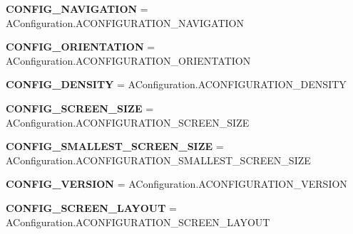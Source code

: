 \begin{DoxyCompactItemize}
{\bfseries C\+O\+N\+F\+I\+G\+\_\+\+N\+A\+V\+I\+G\+A\+T\+I\+ON} = A\+Configuration.\+A\+C\+O\+N\+F\+I\+G\+U\+R\+A\+T\+I\+O\+N\+\_\+\+N\+A\+V\+I\+G\+A\+T\+I\+ON
\item 
\mbox{\label{classconfig_1_1ResTable__config_1_1Config_a75e3389c436ef25b6b6ab44ea451975d}} 
{\bfseries C\+O\+N\+F\+I\+G\+\_\+\+O\+R\+I\+E\+N\+T\+A\+T\+I\+ON} = A\+Configuration.\+A\+C\+O\+N\+F\+I\+G\+U\+R\+A\+T\+I\+O\+N\+\_\+\+O\+R\+I\+E\+N\+T\+A\+T\+I\+ON
\item 
\mbox{\label{classconfig_1_1ResTable__config_1_1Config_a87ebb7ea8eb31b5265d965bba21670ec}} 
{\bfseries C\+O\+N\+F\+I\+G\+\_\+\+D\+E\+N\+S\+I\+TY} = A\+Configuration.\+A\+C\+O\+N\+F\+I\+G\+U\+R\+A\+T\+I\+O\+N\+\_\+\+D\+E\+N\+S\+I\+TY
\item 
\mbox{\label{classconfig_1_1ResTable__config_1_1Config_a337d3ff55747ffadae53a0694fb8a4b1}} 
{\bfseries C\+O\+N\+F\+I\+G\+\_\+\+S\+C\+R\+E\+E\+N\+\_\+\+S\+I\+ZE} = A\+Configuration.\+A\+C\+O\+N\+F\+I\+G\+U\+R\+A\+T\+I\+O\+N\+\_\+\+S\+C\+R\+E\+E\+N\+\_\+\+S\+I\+ZE
\item 
\mbox{\label{classconfig_1_1ResTable__config_1_1Config_adc9975be5ed9595ed38700f4a9c2b9a9}} 
{\bfseries C\+O\+N\+F\+I\+G\+\_\+\+S\+M\+A\+L\+L\+E\+S\+T\+\_\+\+S\+C\+R\+E\+E\+N\+\_\+\+S\+I\+ZE} = A\+Configuration.\+A\+C\+O\+N\+F\+I\+G\+U\+R\+A\+T\+I\+O\+N\+\_\+\+S\+M\+A\+L\+L\+E\+S\+T\+\_\+\+S\+C\+R\+E\+E\+N\+\_\+\+S\+I\+ZE
\item 
\mbox{\label{classconfig_1_1ResTable__config_1_1Config_a5ffcb74779a76837f02ad899c947fbc9}} 
{\bfseries C\+O\+N\+F\+I\+G\+\_\+\+V\+E\+R\+S\+I\+ON} = A\+Configuration.\+A\+C\+O\+N\+F\+I\+G\+U\+R\+A\+T\+I\+O\+N\+\_\+\+V\+E\+R\+S\+I\+ON
\item 
\mbox{\label{classconfig_1_1ResTable__config_1_1Config_a22b81b9de4f3b2f964c9cbf23a23a66b}} 
{\bfseries C\+O\+N\+F\+I\+G\+\_\+\+S\+C\+R\+E\+E\+N\+\_\+\+L\+A\+Y\+O\+UT} = A\+Configuration.\+A\+C\+O\+N\+F\+I\+G\+U\+R\+A\+T\+I\+O\+N\+\_\+\+S\+C\+R\+E\+E\+N\+\_\+\+L\+A\+Y\+O\+UT
\item 

\end{DoxyCompactItemize}
